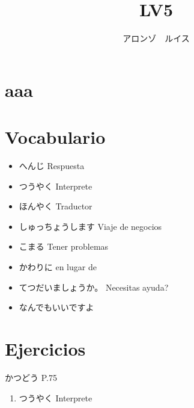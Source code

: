 \documentclass[a4paper,lualatex,ja=standard,base=10pt]{bxjsarticle}
\title{\ruby{第|１１|課}{だい||か} LV5}
\author{アロンゾ　ルイス}
\begin{document}
\setcounter{page}{1}

\maketitle{}
\thispagestyle{fancy}

\section{aaa}

\section{Vocabulario}

\begin{itemize}
  \item へんじ Respuesta
  \item つうやく Interprete
  \item ほんやく Traductor
  \item しゅっちょうします Viaje de negocios
  \item こまる Tener problemas
  \item かわりに en lugar de
  \item てつだいましょうか。 Necesitas ayuda?
  \item なんでもいいですよ
\end{itemize}

\section{Ejercicios}

かつどう P.75

\begin{enumerate}
  \item つうやく Interprete
\end{enumerate}
\end{document}
